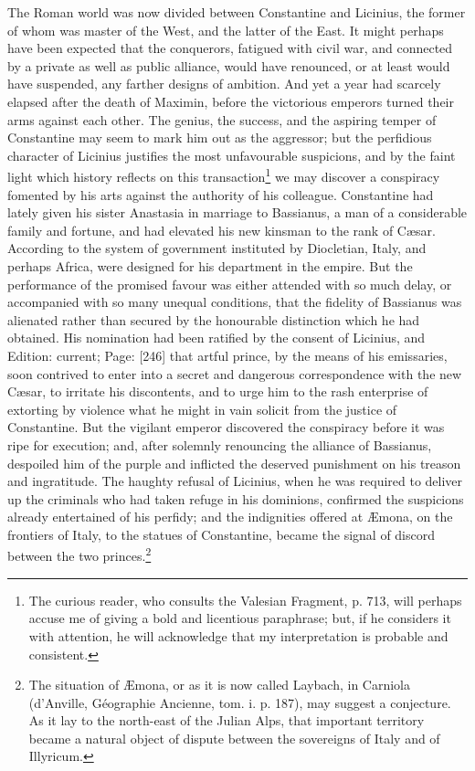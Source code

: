 The Roman world was now divided between Constantine and Licinius, the former of whom was master of the West, and the latter of the East. It might perhaps have been expected that the conquerors, fatigued with civil war, and connected by a private as well as public alliance, would have renounced, or at least would have suspended, any farther designs of ambition. And yet a year had scarcely elapsed after the death of Maximin, before the victorious emperors turned their arms against each other. The genius, the success, and the aspiring temper of Constantine may seem to mark him out as the aggressor; but the perfidious character of Licinius justifies the most unfavourable suspicions, and by the faint light which history reflects on this transaction\footnote{The curious reader, who consults the Valesian Fragment, p. 713, will perhaps accuse me of giving a bold and licentious paraphrase; but, if he considers it with attention, he will acknowledge that my interpretation is probable and consistent.} we may discover a conspiracy fomented by his arts against the authority of his colleague. Constantine had lately given his sister Anastasia in marriage to Bassianus, a man of a considerable family and fortune, and had elevated his new kinsman to the rank of Cæsar. According to the system of government instituted by Diocletian, Italy, and perhaps Africa, were designed for his department in the empire. But the performance of the promised favour was either attended with so much delay, or accompanied with so many unequal conditions, that the fidelity of Bassianus was alienated rather than secured by the honourable distinction which he had obtained. His nomination had been ratified by the consent of Licinius, and Edition: current; Page: [246] that artful prince, by the means of his emissaries, soon contrived to enter into a secret and dangerous correspondence with the new Cæsar, to irritate his discontents, and to urge him to the rash enterprise of extorting by violence what he might in vain solicit from the justice of Constantine. But the vigilant emperor discovered the conspiracy before it was ripe for execution; and, after solemnly renouncing the alliance of Bassianus, despoiled him of the purple and inflicted the deserved punishment on his treason and ingratitude. The haughty refusal of Licinius, when he was required to deliver up the criminals who had taken refuge in his dominions, confirmed the suspicions already entertained of his perfidy; and the indignities offered at Æmona, on the frontiers of Italy, to the statues of Constantine, became the signal of discord between the two princes.\footnote{The situation of Æmona, or as it is now called Laybach, in Carniola (d\texthebrew{}’Anville, Géographie Ancienne, tom. i. p. 187), may suggest a conjecture. As it lay to the north-east of the Julian Alps, that important territory became a natural object of dispute between the sovereigns of Italy and of Illyricum.}

